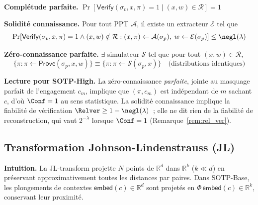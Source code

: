 \begin{sloppypar}
\begin{definition}
\noindent\textbf{Complétude parfaite.}
$\Pr[\mathsf{Verify}(\sigma_v,x,\pi)=1 \;|\; (x,w)\in\mathcal{R}] = 1$

\noindent\textbf{Solidité connaissance.} Pour tout PPT $\mathcal{A}$,
il existe un extracteur $\mathcal{E}$ tel que
\begin{equation}
\Pr\!\left[
\mathsf{Verify}(\sigma_v,x,\pi)=1 \land (x,w)\notin\mathcal{R} :
(x,\pi)\leftarrow\mathcal{A}(\sigma_p),\; w\leftarrow\mathcal{E}(\sigma_p)
\right] \leq \negl(\lambda)
\end{equation}

\noindent\textbf{Zéro-connaissance parfaite.}
$\exists$ simulateur $\mathcal{S}$ tel que pour tout $(x,w)\in\mathcal{R}$,
\begin{equation}
\{\pi : \pi \leftarrow \mathsf{Prove}(\sigma_p,x,w)\}
\equiv
\{\pi : \pi \leftarrow \mathcal{S}(\sigma_p,x)\}
\quad\text{(distributions identiques)}
\end{equation}
\end{definition}

\noindent\textbf{Lecture pour SOTP-High.} La z\'ero-connaissance
\emph{parfaite}, jointe au masquage parfait de l'engagement $c_m$, implique que
$(\pi, c_m)$ est ind\'ependant de $m$ sachant $c$, d'o\`u $\Conf = 1$ au sens statistique.
La solidit\'e connaissance implique la fiabilit\'e de v\'erification
$\Relver \geq 1 - \negl(\lambda)$~; elle ne dit rien de la fiabilit\'e de
reconstruction, qui vaut $2^{-\lambda}$ lorsque $\Conf = 1$
(Remarque~\ref{rem:rel_ver}).

\subsection{Transformation Johnson-Lindenstrauss (JL)}

\noindent\textbf{Intuition.} La JL-transform projette $N$ points de
$\mathbb{R}^d$ dans $\mathbb{R}^k$ ($k \ll d$) en pr\'eservant
approximativement toutes les distances par paires. Dans SOTP-Base,
les plongements de contextes $\mathsf{embed}(c) \in \mathbb{R}^d$ sont projet\'es en
$\Phi\,\mathsf{embed}(c) \in \mathbb{R}^k$, conservant leur proximit\'e.


\end{sloppypar}
